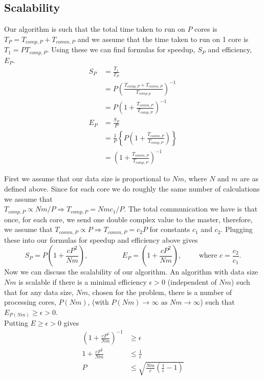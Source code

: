 \documentclass[letterpaper, 12pt]{article}
\begin{document}
	\subsection*{Scalability}
	Our algorithm is such that the total time taken to run on $P$ cores is $T_P = T_{comp,P} + T_{comm,P}$ and we assume that the time taken to run on 1 core is $T_1 = PT_{comp,P}$. Using these we can find formulas for speedup, $S_P$ and efficiency, $E_P$.
	\begin{align*}
		S_P &= \frac{T_1}{T_P} \\
		&= P \left( \frac{T_{comp,P}+T_{comm,P}}{T_{comp,p}} \right)^{-1} \\
		&= P \left( 1 + \frac{T_{comm,P}}{T_{comp,P}} \right)^{-1} \\
		E_P &= \frac{S_P}{P} \\
		&= \frac{1}{P} \left\{ P \left( 1 + \frac{T_{comm,P}}{T_{comp,P}} \right) \right\} \\
		&= \left( 1 + \frac{T_{comm,P}}{T_{comp,P}} \right)^{-1}
	\end{align*}
	
	First we assume that our data size is proportional to $Nm$, where $N$ and $m$ are as defined above. Since for each core we do roughly the same number of calculations we assume that \\
	$T_{comp,P} \varpropto Nm/P \Rightarrow T_{comp,P} = Nmc_1/P$. The total communication we have is that once, for each core, we send one double complex value to the master, therefore, we assume that $T_{comm,P} \varpropto P \Rightarrow T_{comm,P} = c_2 P$ for constants $c_1$ and $c_2$. Plugging these into our formulas for speedup and efficiency above gives
	$$S_P = P \left( 1 + \frac{cP^2}{Nm} \right), \hspace{2cm} E_P = \left( 1 + \frac{cP^2}{Nm} \right), \hspace{1cm} \text{where } c=\frac{c_2}{c_1}.$$
	Now we can discuss the scalability of our algorithm. An algorithm with data size $Nm$ is scalable if there is a minimal efficiency $\epsilon > 0$ (independent of $Nm$) such that for any data size, $Nm$, chosen for the problem, there is a number of processing cores, $P(Nm)$, (with $P(Nm) \rightarrow \infty \text{ as } Nm \rightarrow \infty$) such that $E_{P(Nm)} \ge \epsilon > 0$. \\
	Putting $E \ge \epsilon > 0$ gives
	\begin{align*}
		\left(1 + \frac{cP^2}{Nm} \right)^{-1} &\ge \epsilon \\
		1 + \frac{cP^2}{Nm} &\le \frac{1}{\epsilon} \\
		P &\le \sqrt{\frac{Nm}{c} \left( \frac{1}{\epsilon} - 1 \right)}
	\end{align*}
	
\end{document}
